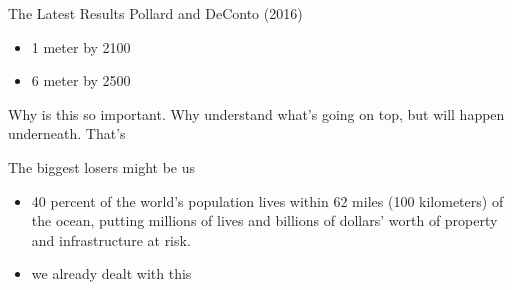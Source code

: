 \documentclass[hide notes,intlimits]{beamer}
\begin{document}
\begin{frame}{The Latest Results}
  Pollard and DeConto (2016)
  \begin{itemize}
  \item 1 meter by 2100
  \item 6 meter by 2500
  \end{itemize}
Why is this so important. Why understand what's going on top, but will happen underneath. That's 
\end{frame}


\begin{frame}{The biggest losers might be us}
\begin{itemize}
\item 40 percent of the world's population lives within 62 miles (100 kilometers) of the ocean, putting millions of lives and billions of dollars' worth of property and infrastructure at risk. 
\item we already dealt with this
\end{itemize}
\end{frame}





{
}
\end{document}
